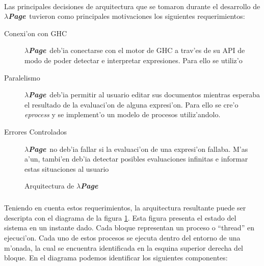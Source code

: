 \documentclass[a4paper]{article}
\newcommand{\hpage}{\textbf{\textsl{$\lambda$Page}}}
\begin{document}
\paragraph{}Las principales decisiones de arquitectura que se tomaron durante el desarrollo de \hpage\ tuvieron como principales motivaciones los siguientes requerimientos:
\begin{description}
\item[Conexi'on con GHC] \hpage\ deb'ia conectarse con el motor de GHC a trav'es de su API de modo de poder detectar e interpretar expresiones.  Para ello se utiliz'o 
\item[Paralelismo] \hpage\ deb'ia permitir al usuario editar sus documentos mientras esperaba el resultado de la evaluaci'on de alguna expresi'on.  Para ello se cre'o \textsl{eprocess} y se implement'o un modelo de procesos utiliz'andolo.
\item[Errores Controlados] \hpage\ no deb'ia fallar si la evaluaci'on de una expresi'on fallaba.  M'as a'un, tambi'en deb'ia detectar posibles evaluaciones infinitas e informar estas situaciones al usuario
\end{description}
\begin{figure}[htbp]
	\begin{center}
		\caption{Arquitectura de \hpage}
		\label{arq1}
	\end{center}
\end{figure}
\subparagraph{}Teniendo en cuenta estos requerimientos, la arquitectura resultante puede ser descripta con el diagrama de la figura \ref{arq1}.  Esta figura presenta el estado del sistema en un instante dado.  Cada bloque representan un proceso o ``thread'' en ejecuci'on.  Cada uno de estos procesos se ejecuta dentro del entorno de una m'onada, la cual se encuentra identificada en la esquina superior derecha del bloque.  En el diagrama podemos identificar los siguientes componentes:
\end{document}
